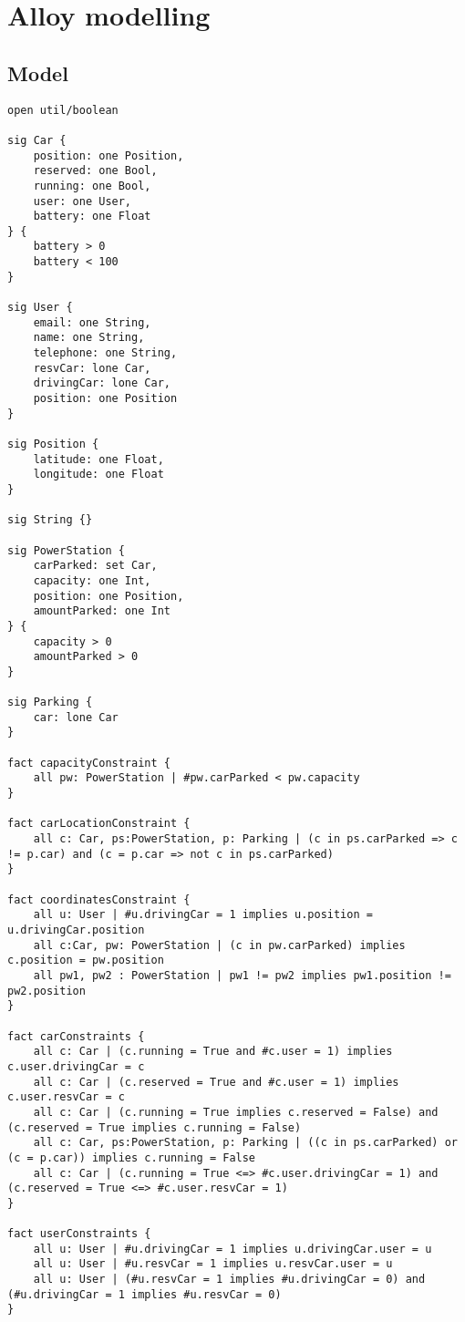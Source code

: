 \chapter{Alloy modelling}

\section{Model}
\begin{verbatim}
open util/boolean

sig Car {
	position: one Position,
	reserved: one Bool,
	running: one Bool,
	user: one User,
	battery: one Float
} {
	battery > 0
	battery < 100
}

sig User {
	email: one String,
	name: one String,
	telephone: one String,
	resvCar: lone Car,
	drivingCar: lone Car,
	position: one Position
}

sig Position {
	latitude: one Float,
	longitude: one Float
}

sig String {}

sig PowerStation {
	carParked: set Car,
	capacity: one Int,
	position: one Position,
	amountParked: one Int
} {
	capacity > 0
	amountParked > 0
}

sig Parking {
	car: lone Car
}

fact capacityConstraint {
	all pw: PowerStation | #pw.carParked < pw.capacity
}

fact carLocationConstraint {
	all c: Car, ps:PowerStation, p: Parking | (c in ps.carParked => c != p.car) and (c = p.car => not c in ps.carParked) 
}

fact coordinatesConstraint {
	all u: User | #u.drivingCar = 1 implies u.position = u.drivingCar.position
	all c:Car, pw: PowerStation | (c in pw.carParked) implies c.position = pw.position
	all pw1, pw2 : PowerStation | pw1 != pw2 implies pw1.position != pw2.position
}

fact carConstraints {
	all c: Car | (c.running = True and #c.user = 1) implies c.user.drivingCar = c
	all c: Car | (c.reserved = True and #c.user = 1) implies c.user.resvCar = c
	all c: Car | (c.running = True implies c.reserved = False) and (c.reserved = True implies c.running = False) 
	all c: Car, ps:PowerStation, p: Parking | ((c in ps.carParked) or (c = p.car)) implies c.running = False 
	all c: Car | (c.running = True <=> #c.user.drivingCar = 1) and (c.reserved = True <=> #c.user.resvCar = 1)
}

fact userConstraints {
	all u: User | #u.drivingCar = 1 implies u.drivingCar.user = u
	all u: User | #u.resvCar = 1 implies u.resvCar.user = u
	all u: User | (#u.resvCar = 1 implies #u.drivingCar = 0) and (#u.drivingCar = 1 implies #u.resvCar = 0)
}


\end{verbatim}
